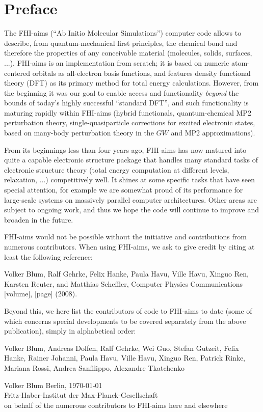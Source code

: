\chapter*{Preface}

The FHI-aims (``Ab Initio Molecular Simulations'') computer code allows to
describe, from quantum-mechanical first principles, the chemical bond and
therefore the properties of any conceivable material (molecules,
solids, surfaces, ...). FHI-aims is an implementation from scratch; it is
based on numeric atom-centered orbitals as all-electron basis functions, and
features density functional theory (DFT) as its primary method for total
energy calculations. However, from the beginning it was our goal to enable
access and functionality \emph{beyond} the bounds of today's highly successful
``standard DFT'', and such functionality is maturing rapidly within FHI-aims
(hybrid functionals, quantum-chemical MP2 perturbation theory,
single-quasiparticle corrections for excited electronic states, based on
many-body perturbation theory in the $GW$ and MP2 approximations). 

From its beginnings less than four years ago, FHI-aims has now matured into
quite a capable electronic structure package that handles many standard tasks
of electronic structure theory (total energy computation at different levels,
relaxation, ...) competitively well. It shines at some specific tasks that
have seen special attention, for example we are somewhat proud of its
performance for large-scale systems on massively parallel computer
architectures. Other areas are subject to ongoing work, and thus we hope the
code will continue to improve and broaden in the future. 

FHI-aims would not be possible without the initiative and
contributions from numerous contributors. When using FHI-aims, we ask
to give credit by citing at least the following reference:

\begin{center}
\parbox[c]{0.8\textwidth}
{\small
Volker Blum, Ralf Gehrke, Felix Hanke, Paula Havu, Ville Havu, Xinguo Ren,
Karsten Reuter, and Matthias Scheffler, Computer Physics Communications
[volume], [page] (2008). 
}
\end{center}

Beyond this, we here list the contributors of code to FHI-aims to date
(some of which concerns special developments to be covered separately
from the above publication), simply in alphabetical order:
\begin{center}
\parbox[c]{0.8\textwidth}
{\small
Volker Blum, Andreas Dolfen, Ralf Gehrke, Wei Guo, Stefan Gutzeit, Felix Hanke,
Rainer Johanni, Paula Havu, Ville Havu, Xinguo Ren, Patrick Rinke,
Mariana Rossi, Andrea Sanfilippo, Alexandre Tkatchenko
}
\end{center}


Volker Blum \hfill Berlin, \today \\
Fritz-Haber-Institut der Max-Planck-Gesellschaft \\
on behalf of the numerous contributors to FHI-aims here and elsewhere
